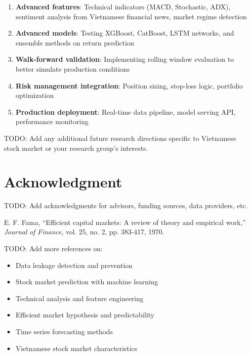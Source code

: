 \documentclass[conference]{IEEEtran}
\begin{document}
\begin{enumerate}
    \item \textbf{Advanced features}: Technical indicators (MACD, Stochastic, ADX), sentiment analysis from Vietnamese financial news, market regime detection
    \item \textbf{Advanced models}: Testing XGBoost, CatBoost, LSTM networks, and ensemble methods on return prediction
    \item \textbf{Walk-forward validation}: Implementing rolling window evaluation to better simulate production conditions
    \item \textbf{Risk management integration}: Position sizing, stop-loss logic, portfolio optimization
    \item \textbf{Production deployment}: Real-time data pipeline, model serving API, performance monitoring
\end{enumerate}

TODO: Add any additional future research directions specific to Vietnamese stock market or your research group's interests.

\section*{Acknowledgment}

TODO: Add acknowledgments for advisors, funding sources, data providers, etc.

\begin{thebibliography}{00}
 E. F. Fama, ``Efficient capital markets: A review of theory and empirical work,'' \textit{Journal of Finance}, vol. 25, no. 2, pp. 383-417, 1970.

 TODO: Add more references on:
\begin{itemize}
    \item Data leakage detection and prevention
    \item Stock market prediction with machine learning
    \item Technical analysis and feature engineering
    \item Efficient market hypothesis and predictability
    \item Time series forecasting methods
    \item Vietnamese stock market characteristics
\end{itemize}

\end{thebibliography}
\end{document}
